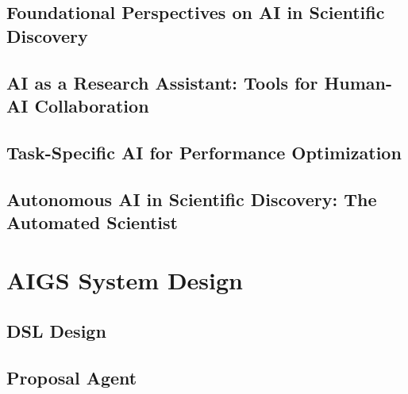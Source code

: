 \documentclass{article}
\begin{document}
\subsection{Foundational Perspectives on AI in Scientific Discovery}


\subsection{AI as a Research Assistant: Tools for Human-AI Collaboration}


\subsection{Task-Specific AI for Performance Optimization}


\subsection{Autonomous AI in Scientific Discovery: The Automated Scientist}


\section{AIGS System Design}



\subsection{DSL Design}


\subsection{Proposal Agent}
\end{document}
